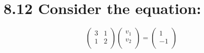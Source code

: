\documentclass{article}
\begin{document}
\section*{8.12 \normalsize Consider the equation:}

\[
  \begin{pmatrix}
    3 & 1 \\ 1 & 2 \\
  \end{pmatrix}
  \begin{pmatrix}
    v_1 \\ v_2 \\
  \end{pmatrix}
  =
  \begin{pmatrix}
    1 \\ -1 \\
  \end{pmatrix}
\]
\end{document}
